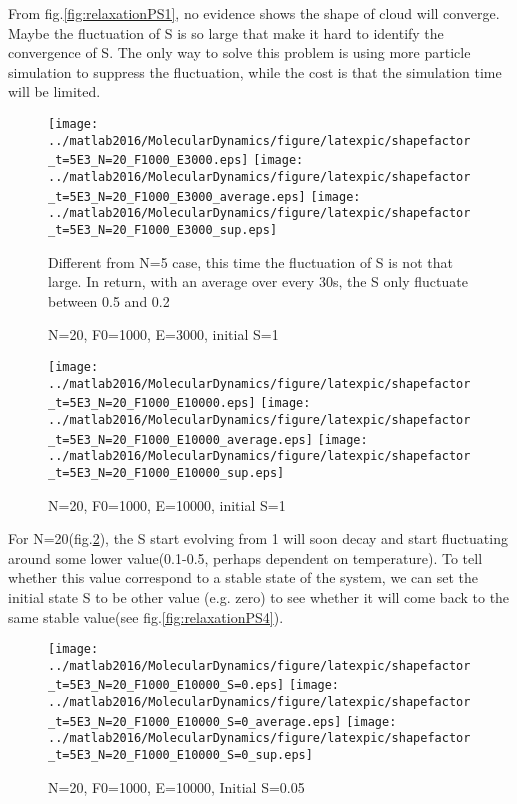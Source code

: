\documentclass[a4paper,onecolumn,12pt]{article}
\begin{document}
From fig.\ref{fig:relaxationPS1}, no evidence shows the shape of cloud will converge. Maybe the fluctuation of S is so large that make it hard to identify the convergence of S. The only way to solve this problem is using more particle simulation to suppress the fluctuation, while the cost is that the simulation time will be limited.


\begin{figure}
\centering
\texttt{[image: ../matlab2016/MolecularDynamics/figure/latexpic/shapefactor\_t=5E3\_N=20\_F1000\_E3000.eps]} 
\texttt{[image: ../matlab2016/MolecularDynamics/figure/latexpic/shapefactor\_t=5E3\_N=20\_F1000\_E3000\_average.eps]}
\texttt{[image: ../matlab2016/MolecularDynamics/figure/latexpic/shapefactor\_t=5E3\_N=20\_F1000\_E3000\_sup.eps]}
\caption{N=20, F0=1000, E=3000, initial S=1}
Different from N=5 case, this time the fluctuation of S is not that large. In return, with an average over every 30s, the S only fluctuate between 0.5 and 0.2
\label{fig:relaxationPS2}
\end{figure}
\begin{figure}
\centering
\texttt{[image: ../matlab2016/MolecularDynamics/figure/latexpic/shapefactor\_t=5E3\_N=20\_F1000\_E10000.eps]} 
\texttt{[image: ../matlab2016/MolecularDynamics/figure/latexpic/shapefactor\_t=5E3\_N=20\_F1000\_E10000\_average.eps]}
\texttt{[image: ../matlab2016/MolecularDynamics/figure/latexpic/shapefactor\_t=5E3\_N=20\_F1000\_E10000\_sup.eps]}
\caption{N=20, F0=1000, E=10000, initial S=1}
\label{fig:relaxationPS3}
\end{figure}

For N=20(fig.\ref{fig:relaxationPS3}), the S start evolving from 1 will soon decay and start fluctuating around some lower value(0.1-0.5, perhaps dependent on temperature). To tell whether this value correspond to a stable state of the system, we can set the initial state S to be other value (e.g. zero) to see whether it will come back to the same stable value(see fig.\ref{fig:relaxationPS4}).

\begin{figure}
\centering
\texttt{[image: ../matlab2016/MolecularDynamics/figure/latexpic/shapefactor\_t=5E3\_N=20\_F1000\_E10000\_S=0.eps]} 
\texttt{[image: ../matlab2016/MolecularDynamics/figure/latexpic/shapefactor\_t=5E3\_N=20\_F1000\_E10000\_S=0\_average.eps]}
\texttt{[image: ../matlab2016/MolecularDynamics/figure/latexpic/shapefactor\_t=5E3\_N=20\_F1000\_E10000\_S=0\_sup.eps]}
\caption{N=20, F0=1000, E=10000, Initial S=0.05}
\label{fig:thermailzationPS4}
\end{figure}
\end{document}
